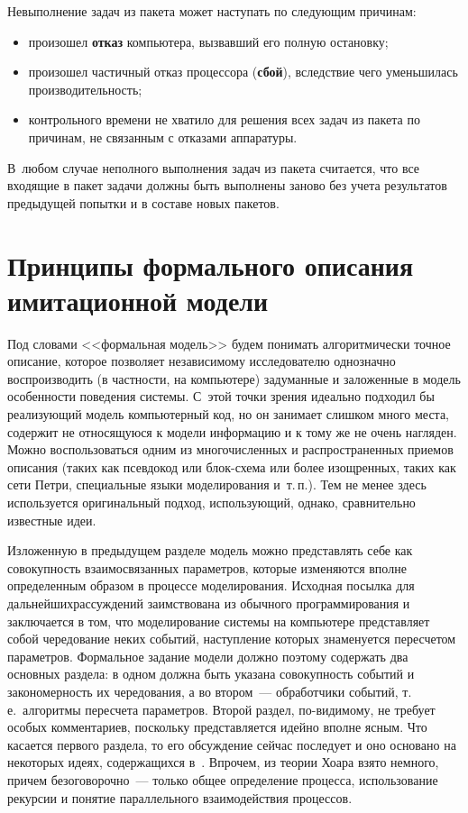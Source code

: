 \begin{multicols}{2}
   Невыполнение задач из пакета может наступать по следующим 
причинам:
   \begin{itemize}
   \item произошел \textbf{отказ} компьютера, вызвавший его полную 
остановку;
   \item произошел частичный отказ процессора (\textbf{сбой}), 
вследствие чего уменьшилась производительность;
   \item контрольного времени не хватило для решения всех задач из 
пакета по причинам, не связанным с отказами аппаратуры.
   \end{itemize}
   
   В~любом случае неполного выполнения задач из пакета считается, что 
все входящие в пакет задачи должны быть выполнены заново без учета 
результатов предыдущей попытки и в составе новых пакетов.

\section{Принципы формального описания имитационной 
модели}
    
    Под словами <<формальная модель>> будем понимать алгоритмически 
точное описание, которое позволяет независимому исследователю 
однозначно воспроизводить (в частности, на компьютере) задуманные и 
заложенные в модель особенности поведения системы. С~этой точки зрения 
идеально подходил бы реализующий модель компьютерный код, но он 
занимает слишком много места, содержит не относящуюся к модели 
информацию и к тому же не очень нагляден. Можно воспользоваться одним 
из многочисленных и распространенных приемов описания (таких как 
псевдокод или блок-схе\-ма или более изощренных, таких как сети Петри, 
специальные языки моделирования и~т.\,п.). Тем не менее здесь 
используется оригинальный подход, использующий, однако, сравнительно 
известные идеи.
    
    Изложенную в предыдущем разделе модель можно представлять себе 
как совокупность взаимосвязанных параметров, которые изменяются\linebreak 
вполне определенным образом в процессе мо\-де\-лирования. Исходная 
посылка для дальнейших\linebreak рассуждений заимствована из обычного 
программирования и заключается в том, что моделирование системы на 
компьютере представляет собой чередование неких событий, наступление 
которых знаменуется пересчетом параметров. Формальное задание модели 
должно поэтому содержать два основных раздела: в одном должна быть 
указана совокупность событий и закономерность их чередования, а во 
втором~--- обработчики событий, т.\,е.\ алгоритмы пересчета параметров. 
Второй раздел, по-видимому, не требует особых комментариев, поскольку 
представляется идейно вполне ясным. Что касается первого раздела, то его 
обсуждение сейчас последует и оно основано на некоторых идеях, 
содержащихся в~\cite{5kon}. Впрочем, из теории Хоара взято немного, 
причем безоговорочно~--- только общее определение процесса, 
использование рекурсии и понятие параллельного взаимодействия 
процессов.
    

\end{multicols}
